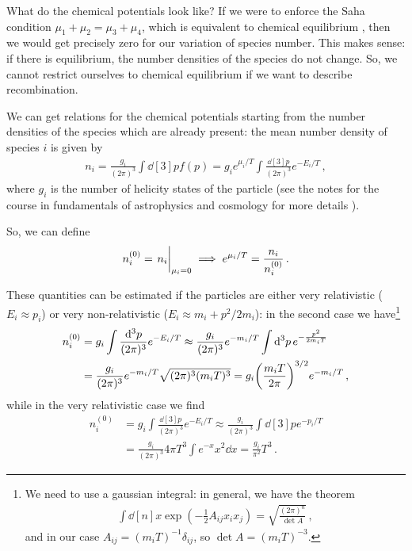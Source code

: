 \documentclass[main.tex]{subfiles}
\begin{document}
What do the chemical potentials look like?
If we were to enforce the Saha condition \(\mu_1 + \mu_2 = \mu_3 + \mu_4 \), which is equivalent to chemical equilibrium , then we would get precisely zero for our variation of species number.
This makes sense: if there is equilibrium, the number densities of the species do not change.
So, we cannot restrict ourselves to chemical equilibrium if we want to describe recombination. 

We can get relations for the chemical potentials starting from the number densities of the species which are already present:
the mean number density of species \(i\) is given by 
%
\begin{align}
n_i = \frac{g_i}{(2\pi)^3} \int \dd[3]{p} f(p)
= g_i e^{\mu_{i} / T} \int \frac{ \dd[3]{p} }{(2 \pi )^3} e^{-E_i / T}
\,,
\end{align}
%
where \(g_i\) is the number of helicity states of the particle (see the notes for the course in fundamentals of astrophysics and cosmology for more details \cite[]{tissinoFundamentalsAstrophysicsCosmology2020}). 

So, we can define 
%
\begin{align}
n_{i}^{(0)} = \eval{n_{i}}_{\mu_{i} = 0 }
\implies 
e^{\mu_i / T} = \frac{n_i}{n_i^{(0)}}
\,.
\end{align}

These quantities can be estimated if the particles are either very relativistic (\(E_i \approx p_i\)) or very non-relativistic (\(E_i \approx m_i + p^2 / 2 m_i\)): in the second case we have\footnote{We need to use a gaussian integral: in general, we have the theorem 
%
\begin{align}
\int \dd[n]{x} \exp(- \frac{1}{2} A_{ij} x_{i} x_{j}) = \sqrt{\frac{(2\pi )^{n}}{\det A}}
\,,
\end{align}
%
and in our case \(A_{ij} =  (m_i T)^{-1} \delta_{ij}\), so \(\det A = (m_i T)^{-3}\).
}
%
\begin{align}
n_{i}^{(0)}  
&= g_i \int \frac{ \dd[3]{p}}{(2 \pi)^3} e^{-E_i / T}
\approx \frac{g_i}{(2 \pi)^3} e^{-m_i / T} \int \dd[3]{p} e^{- \frac{p^2}{2m_i T}} \\
&= \frac{g_i}{(2 \pi)^3} e^{-m_i / T} \sqrt{(2 \pi)^3 (m_i T)^3}  
= g_i \qty(\frac{m_i T}{2 \pi })^{3/2} e^{-m_i / T}
\,,
\end{align}
%
while in the very relativistic case we find 
%
\begin{align}
n_{i}^{(0)}  
&= g_i \int \frac{ \dd[3]{p}}{(2 \pi)^3} e^{-E_i / T}
\approx \frac{g_i}{(2 \pi)^3} \int \dd[3]{p} e^{- p_i / T}  \\
&= \frac{g_i}{(2\pi )^3} 4 \pi T^3 \int e^{-x} x^2 \dd{x}  
= \frac{g_i}{\pi^2} T^3
\,.
\end{align}
\end{document}
